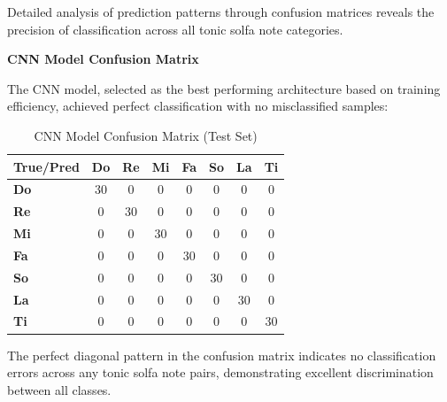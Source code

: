 \documentclass[12pt,a4paper]{article}
\begin{document}
Detailed analysis of prediction patterns through confusion matrices reveals the precision of classification across all tonic solfa note categories.

\textbf{CNN Model Confusion Matrix}

The CNN model, selected as the best performing architecture based on training efficiency, achieved perfect classification with no misclassified samples:

\begin{table}[H]
\centering
\caption{CNN Model Confusion Matrix (Test Set)}
\label{tab:confusion_matrix_cnn}
\begin{tabular}{@{}l|ccccccc@{}}
\toprule
\textbf{True/Pred} & \textbf{Do} & \textbf{Re} & \textbf{Mi} & \textbf{Fa} & \textbf{So} & \textbf{La} & \textbf{Ti} \\
\midrule
\textbf{Do} & 30 & 0 & 0 & 0 & 0 & 0 & 0 \\
\textbf{Re} & 0 & 30 & 0 & 0 & 0 & 0 & 0 \\
\textbf{Mi} & 0 & 0 & 30 & 0 & 0 & 0 & 0 \\
\textbf{Fa} & 0 & 0 & 0 & 30 & 0 & 0 & 0 \\
\textbf{So} & 0 & 0 & 0 & 0 & 30 & 0 & 0 \\
\textbf{La} & 0 & 0 & 0 & 0 & 0 & 30 & 0 \\
\textbf{Ti} & 0 & 0 & 0 & 0 & 0 & 0 & 30 \\
\bottomrule
\end{tabular}
\end{table}

The perfect diagonal pattern in the confusion matrix indicates no classification errors across any tonic solfa note pairs, demonstrating excellent discrimination between all classes.
\end{document}
